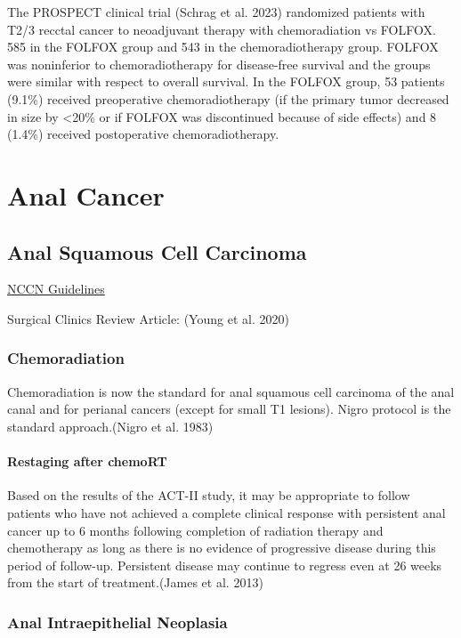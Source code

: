 \documentclass[
  letterpaper,
]{scrbook}
\begin{document}
The PROSPECT clinical trial (Schrag et al. 2023) randomized patients
with T2/3 recctal cancer to neoadjuvant therapy with chemoradiation vs
FOLFOX. 585 in the FOLFOX group and 543 in the chemoradiotherapy group.
FOLFOX was noninferior to chemoradiotherapy for disease-free survival
and the groups were similar with respect to overall survival. In the
FOLFOX group, 53 patients (9.1\%) received preoperative
chemoradiotherapy (if the primary tumor decreased in size by
\textless20\% or if FOLFOX was discontinued because of side effects) and
8 (1.4\%) received postoperative chemoradiotherapy.

\part{Anal Cancer}

\chapter{Anal Squamous Cell
Carcinoma}\label{anal-squamous-cell-carcinoma}

\href{https://www.nccn.org/professionals/physician_gls/pdf/anal_blocks.pdf}{NCCN
Guidelines}

Surgical Clinics Review Article: (Young et al. 2020)

\section{Chemoradiation}\label{chemoradiation}

Chemoradiation is now the standard for anal squamous cell carcinoma of
the anal canal and for perianal cancers (except for small T1 lesions).
Nigro protocol is the standard approach.(Nigro et al. 1983)

\subsection{Restaging after chemoRT}\label{restaging-after-chemort}

Based on the results of the ACT-II study, it may be appropriate to
follow patients who have not achieved a complete clinical response with
persistent anal cancer up to 6 months following completion of radiation
therapy and chemotherapy as long as there is no evidence of progressive
disease during this period of follow-up. Persistent disease may continue
to regress even at 26 weeks from the start of treatment.(James et al.
2013)

\section{Anal Intraepithelial
Neoplasia}\label{anal-intraepithelial-neoplasia}
\end{document}
